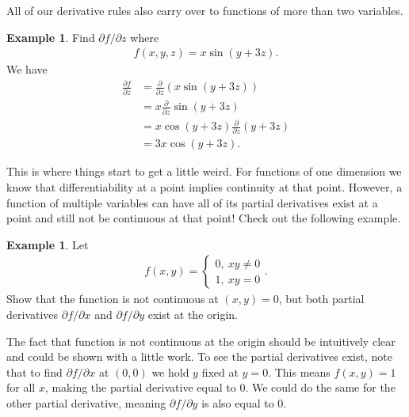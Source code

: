 \documentclass[12pt, letter]{article}
\theoremstyle{plain}
\numberwithin{theorem}{section}
\theoremstyle{definition}
\newtheorem{example}[theorem]{Example}
\begin{document}
\bigskip

\hrulefill

\bigskip

All of our derivative rules also carry over to functions of more than two variables.

\bigskip

\hrulefill

\bigskip

\begin{example}
Find $\partial f / \partial z$ where
\begin{align*}
f(x,y,z) = x\sin(y+3z).
\end{align*}
We have
\begin{align*}
\frac{\partial f}{\partial z} &= \frac{\partial}{\partial z}(x\sin(y+3z))\\
&=x \frac{\partial}{\partial z} \sin(y+3z)\\
&=x\cos(y+3z)\frac{\partial}{\partial z}(y+3z)\\
&=3x\cos(y+3z).
\end{align*}
\end{example}

\bigskip

\hrulefill

\bigskip

This is where things start to get a little weird. For functions of one dimension we know that differentiability at a point implies continuity at that point. However, a function of multiple variables can have all of its partial derivatives exist at a point and still not be continuous at that point! Check out the following example.

\bigskip

\hrulefill

\bigskip

\begin{example}
Let
\begin{align*}
f(x,y) = \begin{cases} 0, \ xy\neq 0 \\ 1, \ xy=0 \end{cases}.
\end{align*}
Show that the function is not continuous at $(x,y)=0$, but both partial derivatives $\partial f / \partial x$ and $\partial f / \partial y$ exist at the origin.

\smallskip

The fact that function is not continuous at the origin should be intuitively clear and could be shown with a little work. To see the partial derivatives exist, note that to find $\partial f / \partial x$ at $(0,0)$ we hold $y$ fixed at $y=0$. This means $f(x,y) = 1$ for all $x$, making the partial derivative equal to 0. We could do the same for the other partial derivative, meaning $\partial f / \partial y$ is also equal to 0.
\end{example}
\end{document}
